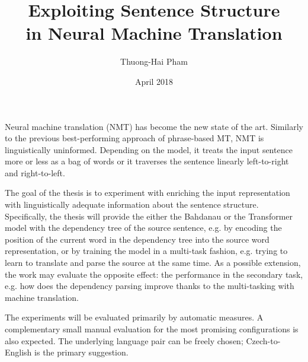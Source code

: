 \documentclass{article}
\title{Exploiting Sentence Structure\\in Neural Machine Translation}
\author{Thuong-Hai Pham}
\date{April 2018}
\begin{document}
\maketitle

Neural machine translation (NMT) has become the new state of the art. Similarly to the previous best-performing approach of phrase-based MT, NMT is linguistically uninformed. Depending on the model, it treats the input sentence more or less as a bag of words or it traverses the sentence linearly left-to-right and right-to-left.

The goal of the thesis is to experiment with enriching the input representation with linguistically adequate information about the sentence structure. Specifically, the thesis will provide the either the Bahdanau or the Transformer model with the dependency tree of the source sentence, e.g. by encoding the position of the current word in the dependency tree into the source word representation, or by training the model in a multi-task fashion, e.g. trying to learn to translate and parse the source at the same time. As a possible extension, the work may evaluate the opposite effect: the performance in the secondary task, e.g. how does the dependency parsing improve thanks to the multi-tasking with machine translation.

The experiments will be evaluated primarily by automatic measures. A complementary small manual evaluation for the most promising configurations is also expected. The underlying language pair can be freely chosen; Czech-to-English is the primary suggestion.
\end{document}
